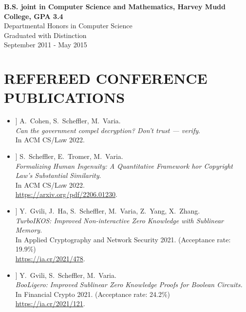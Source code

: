 \documentclass{res}
\begin{document}
\begin{resume}
    \textbf{B.S. joint in Computer Science and Mathematics, Harvey Mudd College, GPA 3.4}  \\        
    Departmental Honors in Computer Science \\
    Graduated with Distinction \\
    September 2011 - May 2015

\section{REFEREED CONFERENCE PUBLICATIONS}
\vspace{0.25in}

\newcommand{\foregoneVerif}{[1]\xspace}
\newcommand{\copyrightMDL}{[2]\xspace}
\newcommand{\turboikos}{[3]\xspace}
\newcommand{\booligero}{[4]\xspace}
\newcommand{\foregoneconclusion}{[5]\xspace}
\newcommand{\AEC}{[6]\xspace}
\newcommand{\devicefingerprinting}{[7]\xspace}
\newcommand{\pullingblocks}{[8]\xspace}
\newcommand{\fairsibility}{[9]\xspace}
\newcommand{\emailspam}{[10]\xspace}

\begin{itemize}
\item[\foregoneVerif] A.~Cohen, S.~Scheffler, M.~Varia. \\
\emph{Can the government compel decryption?  Don't trust --- verify}. \\
In ACM CS/Law 2022.

\item[\copyrightMDL] S.~Scheffler, E.~Tromer, M.~Varia. \\
\emph{Formalizing Human Ingenuity: A Quantitative Framework hor Copyright Law's Substantial Similarity}. \\
In ACM CS/Law 2022. \\
\url{https://arxiv.org/pdf/2206.01230}.

\item[\turboikos] Y.~Gvili, J.~Ha, S.~Scheffler, M.~Varia, Z.~Yang, X.~Zhang. \\
\emph{TurboIKOS: Improved Non-interactive Zero Knowledge with Sublinear Memory.} \\
In Applied Cryptography and Network Security 2021. (Acceptance rate: 19.9\%) \\
\url{https://ia.cr/2021/478}.

\item[\booligero] Y.~Gvili, S.~Scheffler, M.~Varia. \\
\emph{BooLigero: Improved Sublinear Zero Knowledge Proofs for Boolean Circuits.} \\
In Financial Crypto 2021.  (Acceptance rate: 24.2\%) \\
\url{https://ia.cr/2021/121}.


\end{itemize}
\end{resume}
\end{document}
